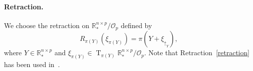 \documentclass[11pt]{article}
\numberwithin{equation}{section}
\DeclareMathOperator{\T}{\mathrm{T}}
\begin{document}
\paragraph{Retraction.} We choose the retraction on $\mathbb{R}_*^{n\times p}/\mathcal{O}_p$ defined by
\begin{equation} \label{retraction}
   		R_{\pi(Y)}(\xi_{\pi(Y)}) = \pi(Y+ \xi_{\uparrow_Y}),
\end{equation}
where $Y \in \mathbb{R}_*^{n \times p}$ and $\xi_{\pi(Y)} \in \T_{\pi(Y)} \mathbb{R}_*^{n\times p}/\mathcal{O}_p$. Note that Retraction~\eqref{retraction} has been used in~\cite{MA20,Zheng2022RiemannianOU}.
\end{document}
